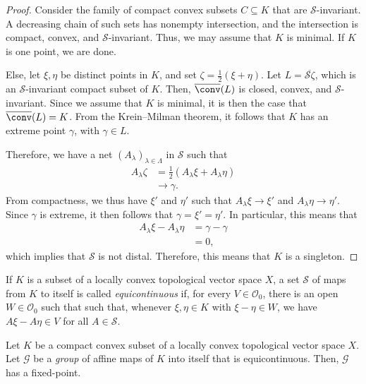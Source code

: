 \documentclass[10pt]{mypackage}
\begin{document}
\begin{proof}
  Consider the family of compact convex subsets $C\subseteq K$ that are $\mathcal{S}$-invariant. A decreasing chain of such sets has nonempty intersection, and the intersection is compact, convex, and $\mathcal{S}$-invariant. Thus, we may assume that $K$ is minimal. If $K$ is one point, we are done.

  Else, let $\xi,\eta$ be distinct points in $K$, and set $\zeta = \frac{1}{2}\left( \xi + \eta \right)$. Let $L = \overline{ \mathcal{S} \zeta }$, which is an $\mathcal{S}$-invariant compact subset of $K$. Then, $ \overline{\conv}(L) $ is closed, convex, and $\mathcal{S}$-invariant. Since we assume that $K$ is minimal, it is then the case that $ \overline{\conv}(L) = K $. From the Krein--Milman theorem, it follows that $K$ has an extreme point $\gamma$, with $\gamma\in L$.

  Therefore, we have a net $\left( A_{\lambda} \right)_{\lambda\in \Lambda}$ in $ \mathcal{S} $ such that
  \begin{align*}
    A_{\lambda}\zeta &= \frac{1}{2} \left( A_{\lambda}\xi + A_{\lambda}\eta \right)\\
                     &\rightarrow \gamma.
  \end{align*}
  From compactness, we thus have $\xi'$ and $\eta'$ such that $A_{\lambda}\xi\rightarrow \xi'$ and $A_{\lambda}\eta\rightarrow \eta'$. Since $\gamma$ is extreme, it then follows that $\gamma = \xi'=\eta'$. In particular, this means that
  \begin{align*}
    A_{\lambda}\xi - A_{\lambda}\eta &= \gamma - \gamma\\
                                     &= 0,
  \end{align*}
  which implies that $ \mathcal{S} $ is not distal. Therefore, this means that $K$ is a singleton.
\end{proof}
\begin{definition}
  If $K$ is a subset of a locally convex topological vector space $X$, a set $ \mathcal{S} $ of maps from $K$ to itself is called \textit{equicontinuous} if, for every $V\in \mathcal{O}_{0}$, there is an open $ W\in \mathcal{O}_{0} $ such that such that, whenever $\xi,\eta\in K$ with $\xi-\eta\in W$, we have $A\xi - A\eta \in V$ for all $A\in \mathcal{S}$.
\end{definition}
\begin{theorem}
  Let $K$ be a compact convex subset of a locally convex topological vector space $X$. Let $ \mathcal{G} $ be a \textit{group} of affine maps of $K$ into itself that is equicontinuous. Then, $\mathcal{G}$ has a fixed-point.
\end{theorem}
\end{document}
